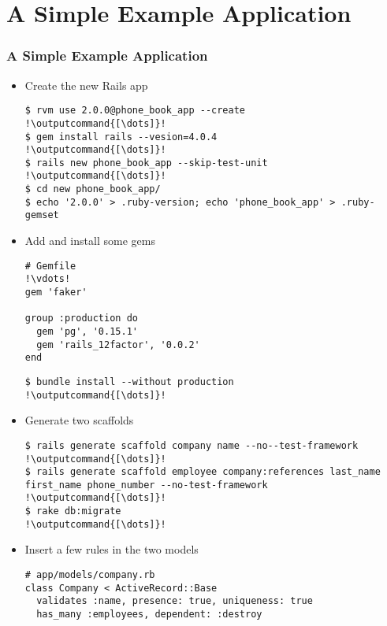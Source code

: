 \documentclass{beamer}
\newcommand{\outputcommand}[1]{\color{darkgreen}{#1}}
\begin{document}
\section{A Simple Example Application}
\begin{frame}
\frametitle{A Simple Example Application}
\begin{itemize}
\item Create the new Rails app

\lstset{language=shell}
\begin{lstlisting}[escapechar=!]
$ rvm use 2.0.0@phone_book_app --create
!\outputcommand{[\dots]}!
$ gem install rails --vesion=4.0.4
!\outputcommand{[\dots]}!
$ rails new phone_book_app --skip-test-unit
!\outputcommand{[\dots]}!
$ cd new phone_book_app/
$ echo '2.0.0' > .ruby-version; echo 'phone_book_app' > .ruby-gemset
\end{lstlisting}

\item Add and install some gems

\lstset{language=Ruby, style=eclipse}
\begin{lstlisting}[escapechar=!]
# Gemfile
!\vdots!
gem 'faker'

group :production do
  gem 'pg', '0.15.1'
  gem 'rails_12factor', '0.0.2'
end
\end{lstlisting}

\lstset{language=shell}
\begin{lstlisting}[escapechar=!]
$ bundle install --without production
!\outputcommand{[\dots]}!
\end{lstlisting}

\item Generate two scaffolds
\lstset{language=shell}
\begin{lstlisting}[escapechar=!]
$ rails generate scaffold company name --no--test-framework
!\outputcommand{[\dots]}!
$ rails generate scaffold employee company:references last_name first_name phone_number --no-test-framework
!\outputcommand{[\dots]}!
$ rake db:migrate
!\outputcommand{[\dots]}!
\end{lstlisting}

\item Insert a few rules in the two models
\lstset{language=Ruby, style=eclipse}
\begin{lstlisting}
# app/models/company.rb
class Company < ActiveRecord::Base
  validates :name, presence: true, uniqueness: true
  has_many :employees, dependent: :destroy


\end{lstlisting}
\end{itemize}
\end{frame}
\end{document}
